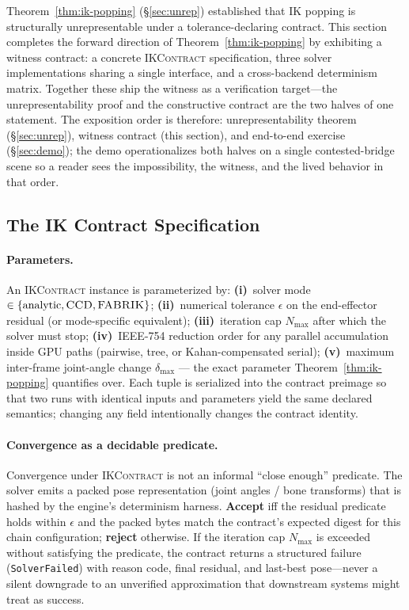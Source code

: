 \documentclass[sigconf,nonacm]{acmart}
\newcommand{\ikcontract}{\textsc{IKContract}}
\newcommand{\fabrik}{\textsc{FABRIK}}
\newcommand{\ccd}{\textsc{CCD}}
\begin{document}
Theorem~\ref{thm:ik-popping} (\S\ref{sec:unrep}) established that IK popping
is structurally unrepresentable under a tolerance-declaring contract. This
section completes the forward direction of Theorem~\ref{thm:ik-popping} by
exhibiting a witness contract: a concrete \ikcontract{} specification, three
solver implementations sharing a single interface, and a cross-backend
determinism matrix. Together these ship the witness as a verification
target---the unrepresentability proof and the constructive contract are the
two halves of one statement. The exposition order is therefore:
unrepresentability theorem (\S\ref{sec:unrep}), witness contract (this
section), and end-to-end exercise (\S\ref{sec:demo}); the demo
operationalizes both halves on a single contested-bridge scene so a reader
sees the impossibility, the witness, and the lived behavior in that order.

\subsection{The IK Contract Specification}
\label{sec:ik:contract}

\paragraph{Parameters.}
An \ikcontract{} instance is parameterized by: \textbf{(i)}~solver mode
$\in \{\text{analytic}, \ccd{}, \fabrik{}\}$; \textbf{(ii)}~numerical
tolerance $\epsilon$ on the end-effector residual (or mode-specific
equivalent); \textbf{(iii)}~iteration cap $N_{\max}$ after which the
solver must stop; \textbf{(iv)}~IEEE-754 reduction order for any parallel
accumulation inside GPU paths (pairwise, tree, or Kahan-compensated
serial); \textbf{(v)}~maximum inter-frame joint-angle change $\delta_{\max}$
--- the exact parameter Theorem~\ref{thm:ik-popping} quantifies over.
Each tuple is serialized into the contract preimage so that two
runs with identical inputs and parameters yield the same declared
semantics; changing any field intentionally changes the contract identity.

\paragraph{Convergence as a decidable predicate.}
Convergence under \ikcontract{} is not an informal ``close enough''
predicate. The solver emits a packed pose representation (joint angles /
bone transforms) that is hashed by the engine's determinism harness.
\textbf{Accept} iff the residual predicate holds within $\epsilon$ and the
packed bytes match the contract's expected digest for this chain
configuration; \textbf{reject} otherwise. If the iteration cap $N_{\max}$
is exceeded without satisfying the predicate, the contract returns a
structured failure (\texttt{SolverFailed}) with reason code, final
residual, and last-best pose---never a silent downgrade to an unverified
approximation that downstream systems might treat as success.
\end{document}
